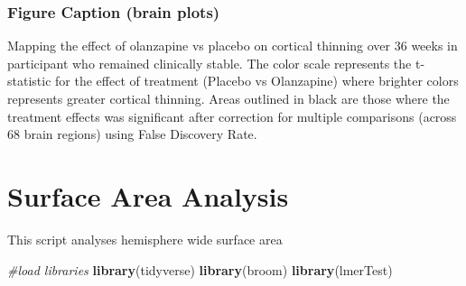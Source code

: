 \documentclass[]{article}
\newenvironment{Shaded}{\begin{snugshade}}{\end{snugshade}}
\newcommand{\KeywordTok}[1]{\textcolor[rgb]{0.13,0.29,0.53}{\textbf{#1}}}
\newcommand{\StringTok}[1]{\textcolor[rgb]{0.31,0.60,0.02}{#1}}
\newcommand{\CommentTok}[1]{\textcolor[rgb]{0.56,0.35,0.01}{\textit{#1}}}
\newcommand{\NormalTok}[1]{#1}
\theoremstyle{definition}
\theoremstyle{definition}
\theoremstyle{definition}
\theoremstyle{remark}
\begin{document}
\subsubsection{Figure Caption (brain
plots)}\label{figure-caption-brain-plots}

Mapping the effect of olanzapine vs placebo on cortical thinning over 36
weeks in participant who remained clinically stable. The color scale
represents the t-statistic for the effect of treatment (Placebo vs
Olanzapine) where brighter colors represents greater cortical thinning.
Areas outlined in black are those where the treatment effects was
significant after correction for multiple comparisons (across 68 brain
regions) using False Discovery Rate.

\section{Surface Area Analysis}\label{surface-area-analysis}

This script analyses hemisphere wide surface area

\begin{Shaded}
\begin{Highlighting}[]
\CommentTok{#load libraries}
\KeywordTok{library}\NormalTok{(tidyverse)}
\KeywordTok{library}\NormalTok{(broom)}
\KeywordTok{library}\NormalTok{(lmerTest)}
\end{Highlighting}
\end{Shaded}

\begin{Shaded}
\end{Shaded}
\end{document}

